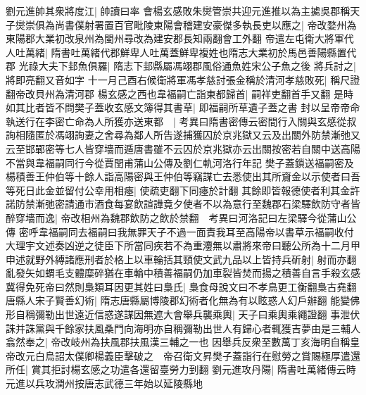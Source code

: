 劉元進帥其衆將度江|{
	帥讀曰率}
會楊玄感敗朱爕管崇共迎元進推以為主㨿吳郡稱天子爕崇俱為尚書僕射署置百官毗陵東陽會稽建安豪傑多執長吏以應之|{
	帝改婺州為東陽郡大業初改泉州為閩州尋改為建安郡長知兩翻會工外翻}
帝遣左屯衛大將軍代人吐萬緒|{
	隋書吐萬緒代郡鮮卑人吐萬蓋鮮卑複姓也隋志大業初於馬邑善陽縣置代郡}
光祿大夫下邽魚俱羅|{
	隋志下邽縣屬馮翊郡風俗通魚姓宋公子魚之後}
將兵討之|{
	將即亮翻又音如字}
十一月己酉右候衛將軍馮孝慈討張金稱於清河孝慈敗死|{
	稱尺證翻帝改貝州為清河郡}
楊玄感之西也韋福嗣亡詣東都歸首|{
	嗣祥吏翻首手又翻}
是時如其比者皆不問樊子蓋收玄感文簿得其書草|{
	即福嗣所草遺子蓋之書}
封以呈帝帝命執送行在李密亡命為人所獲亦送東都　|{
	考異曰隋書密傳云密間行入關與玄感從叔詢相隨匿於馮翊詢妻之舍尋為鄰人所告遂捕獲囚於京兆獄又云及出關外防禁漸弛又云至邯鄲密等七人皆穿墻而遁唐書雖不云囚於京兆獄亦云出關按密若自關中送高陽不當與韋福嗣同行今從賈閏甫蒲山公傳及劉仁軌河洛行年記}
樊子蓋鎻送福嗣密及楊積善王仲伯等十餘人詣高陽密與王仲伯等竊謀亡去悉使出其所齎金以示使者曰吾等死日此金並留付公幸用相瘞|{
	使疏吏翻下同瘞於計翻}
其餘即皆報德使者利其金許諾防禁漸弛密請通市酒食每宴飲諠譁竟夕使者不以為意行至魏郡石梁驛飲防守者皆醉穿墻而逸|{
	帝改相州為魏郡飲防之飲於禁翻　考異曰河洛記曰左梁驛今從蒲山公傳}
密呼韋福嗣同去福嗣曰我無罪天子不過一面責我耳至高陽帝以書草示福嗣收付大理宇文述奏凶逆之徒臣下所當同疾若不為重灋無以肅將來帝曰聽公所為十二月甲申述就野外縛諸應刑者於格上以車輪括其頸使文武九品以上皆持兵斫射|{
	射而亦翻}
亂發矢如蝟毛支體糜碎猶在車輪中積善福嗣仍加車裂皆焚而揚之積善自言手殺玄感冀得免死帝曰然則梟類耳因更其姓曰梟氏|{
	梟食母說文曰不孝鳥更工衡翻梟古堯翻}
唐縣人宋子賢善幻術|{
	隋志唐縣屬博陵郡幻術者化無為有以眩惑人幻戶辦翻}
能變佛形自稱彌勒出世遠近信惑遂謀因無遮大會舉兵襲乘輿|{
	天子曰乘輿乘繩證翻}
事泄伏誅并誅黨與千餘家扶風桑門向海明亦自稱彌勒出世人有歸心者輒獲吉夢由是三輔人翕然奉之|{
	帝改岐州為扶風郡扶風漢三輔之一也}
因舉兵反衆至數萬丁亥海明自稱皇帝改元白烏詔太僕卿楊義臣擊破之　帝召衛文昇樊子蓋詣行在慰勞之賞賜極厚遣還所任|{
	賞其拒討楊玄感之功遣各還留臺勞力到翻}
劉元進攻丹陽|{
	隋書吐萬緒傳云時元進以兵攻潤州按唐志武德三年始以延陵縣地}


